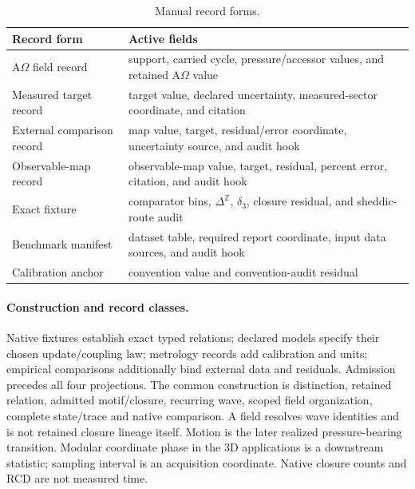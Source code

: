 \begin{table}[H]
\centering
\scriptsize
\caption{Manual record forms.}
\begin{tabularx}{\textwidth}{lX}
\toprule
Record form & Active fields\\
\midrule
A\(\Omega\) field record & support, carried cycle, pressure/accessor values, and retained A\(\Omega\) value\\
Measured target record & target value, declared uncertainty, measured-sector coordinate, and citation\\
External comparison record & map value, target, residual/error coordinate, uncertainty source, and audit hook\\
Observable-map record & observable-map value, target, residual, percent error, citation, and audit hook\\
Exact fixture & comparator bins, \(\Delta^{\mathbb Z}\), \(\delta_3\), closure residual, and sheddic-route audit\\
Benchmark manifest & dataset table, required report coordinate, input data sources, and audit hook\\
Calibration anchor & convention value and convention-audit residual\\
\bottomrule
\end{tabularx}
\label{tab:manual-record-forms}
\end{table}

\paragraph{Construction and record classes.}
Native fixtures establish exact typed relations; declared models specify their
chosen update/coupling law; metrology records add calibration and units;
empirical comparisons additionally bind external data and residuals. Admission
precedes all four projections. The common construction is distinction,
retained relation, admitted motif/closure, recurring wave, scoped field
organization, complete state/trace and native comparison. A field resolves
wave identities and is not retained closure lineage itself. Motion is the
later realized pressure-bearing transition. Modular coordinate phase in the
3D applications is a downstream statistic; sampling interval is an acquisition
coordinate. Native closure counts and RCD are not measured time.
